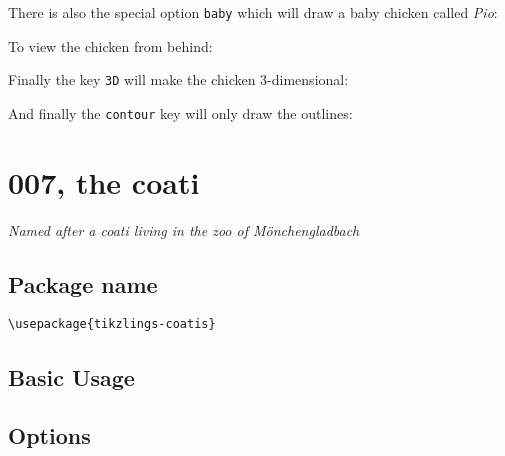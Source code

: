 \documentclass[parskip=half]{scrartcl}
\begin{document}
There is also the special option \lstinline|baby| which will draw a baby chicken called \emph{Pio}:
\begin{tcblisting}{}
\chicken[baby=yellow]
\end{tcblisting}

To view the chicken from behind:
\begin{tcblisting}{}
\chicken[back]
\end{tcblisting}

Finally the key \lstinline|3D| will make the chicken 3-dimensional:
\begin{tcblisting}{}
\chicken[3D]
\end{tcblisting}

And finally the \lstinline|contour| key will only draw the outlines:
\begin{tcblisting}{}
\chicken[contour=black]
\end{tcblisting}

%
%
\clearpage
\section[Coati]{007, the coati}

\emph{Named after a coati living in the zoo of M\"onchengladbach}

\subsection{Package name}

\begin{tcolorbox}[lower separated=false, lefthand width=.8\linewidth]
\vspace*{0.5cm}
\lstinline|\usepackage{tikzlings-coatis}| 
\vspace*{0.5cm}
\end{tcolorbox}

\subsection{Basic Usage}

\begin{tcblisting}{}
\coati
\end{tcblisting}

\subsection{Options}
\end{document}
